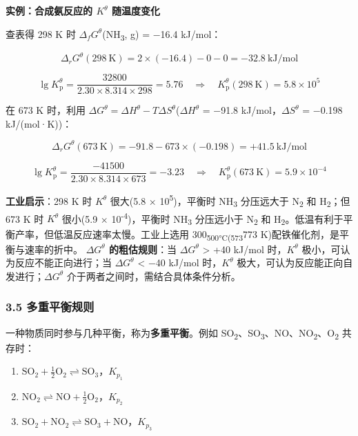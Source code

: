 \documentclass[a4paper,11pt]{ctexart}
\providecommand{\tightlist}{\setlength{\itemsep}{0pt}\setlength{\parskip}{0pt}}
\newcommand{\箭}{\ensuremath{\rightarrow}}
\newcommand{\左箭}{\ensuremath{\leftarrow}}
\newcommand{\上箭}{\ensuremath{\uparrow}}
\newcommand{\下箭}{\ensuremath{\downarrow}}
\newcommand{\衡}{\ensuremath{\rightleftharpoons}}
\newcommand{\双箭}{\ensuremath{\leftrightarrow}}
\newcommand{\约等于}{\ensuremath{\approx}}
\newcommand{\小于等于}{\ensuremath{\leq}}
\newcommand{\大于等于}{\ensuremath{\geq}}
\newcommand{\不等于}{\ensuremath{\neq}}
\newcommand{\西格马}{\ensuremath{\sigma}}
\newcommand{\派}{\ensuremath{\pi}}
\begin{document}
\textbf{实例：合成氨反应的 \(K^\theta\) 随温度变化}

查表得 298 K 时 \(\Delta_f G^\theta\)(NH\textsubscript{3}, g) = −16.4 kJ/mol：

\[
\Delta_r G^\theta(298\ \mathrm{K}) = 2 \times (-16.4) - 0 - 0 = -32.8\ \mathrm{kJ/mol}
\]

\[
\lg K_{\mathrm p}^\theta = \frac{32800}{2.30 \times 8.314 \times 298} = 5.76 \quad \Rightarrow \quad K_{\mathrm p}^\theta(298\ \mathrm{K}) = 5.8 \times 10^5
\]

在 673 K 时，利用 \(\Delta G^\theta = \Delta H^\theta - T\Delta S^\theta\)(\(\Delta H^\theta\) = −91.8 kJ/mol，\(\Delta S^\theta\) = −0.198 kJ/(mol·K))：

\[
\Delta_r G^\theta(673\ \mathrm{K}) = -91.8 - 673 \times (-0.198) = +41.5\ \mathrm{kJ/mol}
\]

\[
\lg K_{\mathrm p}^\theta = \frac{-41500}{2.30 \times 8.314 \times 673} = -3.23 \quad \Rightarrow \quad K_{\mathrm p}^\theta(673\ \mathrm{K}) = 5.9 \times 10^{-4}
\]

\textbf{工业启示}：298 K 时 \(K^\theta\) 很大(5.8 × 10\textsuperscript{5})，平衡时 NH\textsubscript{3} 分压远大于 N\textsubscript{2} 和 H\textsubscript{2}；但 673 K 时 \(K^\theta\) 很小(5.9 × 10\textsuperscript{-4})，平衡时 NH\textsubscript{3} 分压远小于 N\textsubscript{2} 和 H\textsubscript{2}。低温有利于平衡产率，但低温反应速率太慢。工业上选用 300\textsubscript{500°C(573}773 K)配铁催化剂，是平衡与速率的折中。
\textbf{\(\Delta G^\theta\) 的粗估规则}：当 \(\Delta G^\theta\) \textgreater{} +40 kJ/mol 时，\(K^\theta\) 极小，可认为反应不能正向进行；当 \(\Delta G^\theta\) \textless{} −40 kJ/mol 时，\(K^\theta\) 极大，可认为反应能正向自发进行；\(\Delta G^\theta\) 介于两者之间时，需结合具体条件分析。

\subsubsection{3.5 多重平衡规则}\label{ux591aux91cdux5e73ux8861ux89c4ux5219}

一种物质同时参与几种平衡，称为\textbf{多重平衡}。例如 SO\textsubscript{2}、SO\textsubscript{3}、NO、NO\textsubscript{2}、O\textsubscript{2} 共存时：

\begin{enumerate}
\def\labelenumi{\arabic{enumi}.}
\tightlist
\item
  \(\mathrm{SO_2 + \frac{1}{2}O_2 \rightleftharpoons SO_3}\)，\(K_{p_1}\)
\item
  \(\mathrm{NO_2 \rightleftharpoons NO + \frac{1}{2}O_2}\)，\(K_{p_2}\)
\item
  \(\mathrm{SO_2 + NO_2 \rightleftharpoons SO_3 + NO}\)，\(K_{p_3}\)
\end{enumerate}
\end{document}
